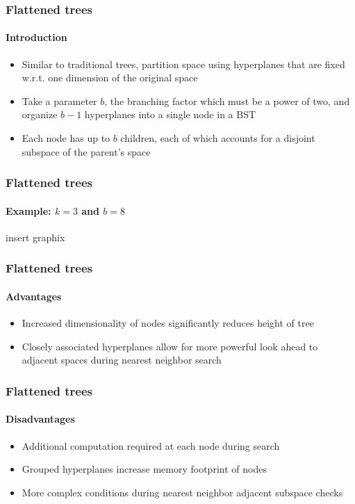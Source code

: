 
\begin{frame}
  \frametitle{Flattened \kd trees}
  \framesubtitle{Introduction}

  \begin{itemize}
    \item Similar to traditional \kd trees, partition space using hyperplanes that are 
      fixed w.r.t. one dimension of the original space
    \item Take a parameter $b$, the branching factor which must be a power of two, and
      organize $b-1$ hyperplanes into a single node in a BST
    \item Each node has up to $b$ children, each of which accounts for a disjoint subspace 
      of the parent's space
  \end{itemize}

\end{frame}

\begin{frame}
  \frametitle{Flattened \kd trees}
  \framesubtitle{Example: $k=3$ and $b=8$}

  insert graphix

\end{frame}

\begin{frame}
  \frametitle{Flattened \kd trees}
  \framesubtitle{Advantages}

  \begin{itemize}
    \item Increased dimensionality of nodes significantly reduces height of tree
    \item Closely associated hyperplanes allow for more powerful look ahead to adjacent
      spaces during nearest neighbor search
  \end{itemize}

\end{frame}

\begin{frame}
  \frametitle{Flattened \kd trees}
  \framesubtitle{Disadvantages}

  \begin{itemize}
    \item Additional computation required at each node during search
    \item Grouped hyperplanes increase memory footprint of nodes 
    \item More complex conditions during nearest neighbor adjacent subspace
      checks
  \end{itemize}

\end{frame}

